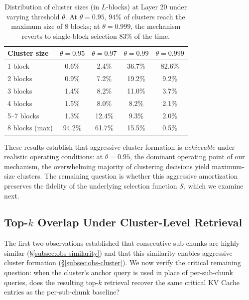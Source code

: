 \documentclass[10pt,conference]{IEEEtran}
\begin{document}
\begin{table}[t]
\centering
\caption{Distribution of cluster sizes (in $L$-blocks) at Layer 20 
under varying threshold $\theta$. At $\theta = 0.95$, $94\%$ of 
clusters reach the maximum size of $8$ blocks; at $\theta = 0.999$, 
the mechanism reverts to single-block selection $83\%$ of the time.}
\label{tab:cluster-merge-rate}
\small
\begin{tabular}{lcccc}
\toprule
Cluster size & $\theta\!=\!0.95$ & $\theta\!=\!0.97$ & $\theta\!=\!0.99$ & $\theta\!=\!0.999$ \\
\midrule
1 block        & \phantom{0}0.6\% & \phantom{0}2.4\% & 36.7\% & 82.6\% \\
2 blocks       & \phantom{0}0.9\% & \phantom{0}7.2\% & 19.2\% & \phantom{0}9.2\% \\
3 blocks       & \phantom{0}1.4\% & \phantom{0}8.2\% & 11.0\% & \phantom{0}3.7\% \\
4 blocks       & \phantom{0}1.5\% & \phantom{0}8.0\% & \phantom{0}8.2\% & \phantom{0}2.1\% \\
5--7 blocks    & \phantom{0}1.3\% & 12.4\% & \phantom{0}9.3\% & \phantom{0}2.0\% \\
8 blocks (max) & 94.2\% & 61.7\% & 15.5\% & \phantom{0}0.5\% \\
\bottomrule
\end{tabular}
\end{table}

These results establish that aggressive cluster formation is 
\textit{achievable} under realistic operating conditions: at 
$\theta = 0.95$, the dominant operating point of our mechanism, the 
overwhelming majority of clustering decisions yield maximum-size 
clusters. The remaining question is whether this aggressive 
amortization preserves the fidelity of the underlying selection 
function $\mathcal{S}$, which we examine next.


\subsection{Top-$k$ Overlap Under Cluster-Level Retrieval}
\label{subsec:obs-topk-overlap}

The first two observations established that consecutive sub-chunks 
are highly similar (§\ref{subsec:obs-similarity}) and that this 
similarity enables aggressive cluster formation 
(§\ref{subsec:obs-cluster}). We now verify the critical remaining 
question: when the cluster's anchor query is used in place of
per-sub-chunk queries, does the resulting top-$k$ retrieval recover the
same critical KV Cache entries as the per-sub-chunk baseline?
\end{document}
